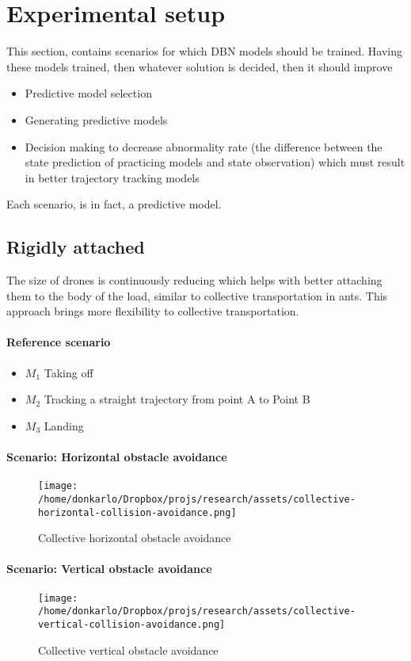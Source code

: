 \documentclass{article}
\begin{document}
		
	\section{Experimental setup} \label{experimental-setup}
		This section, contains scenarios for which DBN models should be trained. Having these models trained, then whatever solution is decided, then it should improve 
		\begin{itemize}
			\item Predictive model selection
			\item Generating predictive models
			\item Decision making to decrease abnormality rate (the difference between the state prediction of practicing models and state observation) which must result in better trajectory tracking models
		\end{itemize}
		Each scenario, is in fact, a predictive model.
		\subsection{Rigidly attached}
			The size of drones is continuously reducing which helps with better attaching them to the body of the load, similar to collective transportation in ants. This approach brings more flexibility to collective transportation.
			\paragraph{Reference scenario}
				 \begin{itemize}
				 	\item $M_1$ Taking off
				 	\item $M_2$ Tracking a straight trajectory from point A to Point B
				 	\item $M_3$ Landing
				 \end{itemize}
			 
			\paragraph{Scenario: Horizontal obstacle avoidance}
				\begin{figure*}
					\centering
					\texttt{[image: /home/donkarlo/Dropbox/projs/research/assets/collective-horizontal-collision-avoidance.png]}
					\caption{Collective horizontal obstacle avoidance}
					\label{fig:swarm-drones-reference-task}
				\end{figure*}
			\paragraph{Scenario: Vertical obstacle avoidance}
				\begin{figure*}
					\centering
					\texttt{[image: /home/donkarlo/Dropbox/projs/research/assets/collective-vertical-collision-avoidance.png]}
					\caption{Collective vertical obstacle avoidance}
					\label{fig:collective-vertical-collision-avoidance}
				\end{figure*}
\end{document}
